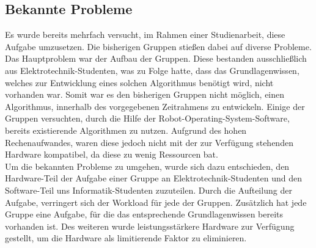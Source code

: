 \subsection{Bekannte Probleme}
    Es wurde bereits mehrfach versucht, im Rahmen einer Studienarbeit, diese Aufgabe umzusetzen.
    Die bisherigen Gruppen stießen dabei auf diverse Probleme.
    Das Hauptproblem war der Aufbau der Gruppen.
    Diese bestanden ausschließlich aus Elektrotechnik-Studenten, was zu Folge hatte, dass das Grundlagenwissen, welches zur Entwicklung eines solchen Algorithmus benötigt wird, nicht vorhanden war.
    Somit war es den bisherigen Gruppen nicht möglich, einen Algorithmus, innerhalb des vorgegebenen Zeitrahmens zu entwickeln.
    Einige der Gruppen versuchten, durch die Hilfe der Robot-Operating-System-Software, bereits existierende Algorithmen zu nutzen. 
    Aufgrund des hohen Rechenaufwandes, waren diese jedoch nicht mit der zur Verfügung stehenden Hardware kompatibel, da diese zu wenig Ressourcen bat. \\ %

    Um die bekannten Probleme zu umgehen, wurde sich dazu entschieden, den Hardware-Teil der Aufgabe einer Gruppe an Elektrotechnik-Studenten und den Software-Teil uns Informatik-Studenten zuzuteilen.
    Durch die Aufteilung der Aufgabe, verringert sich der Workload für jede der Gruppen. 
    Zusätzlich hat jede Gruppe eine Aufgabe, für die das entsprechende Grundlagenwissen bereits vorhanden ist.
    Des weiteren wurde leistungsstärkere Hardware zur Verfügung gestellt, um die Hardware als limitierende Faktor zu eliminieren. %

\newpage
